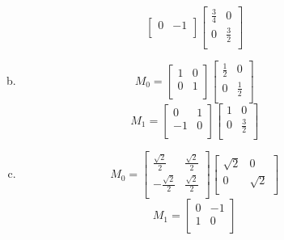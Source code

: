 \documentclass[11pt, oneside]{article}
\begin{document}
\begin{enumerate}[Problem 1:]
\begin{enumerate}[1.]
\begin{enumerate}[a)]
\[\begin{bmatrix}
                0 & -1\\
              \end{bmatrix}
              \begin{bmatrix}
                \frac 3 4 & 0\\
                0 & \frac 3 2\\
              \end{bmatrix}
            \]
          \item
            \[
              M_0 = 
              \begin{bmatrix}
                1 & 0\\
                0 & 1\\
              \end{bmatrix}
              \begin{bmatrix}
                \frac 1 2 & 0\\
                0 & \frac 1 2\\
              \end{bmatrix}
            \]
            \[
              M_1 = 
              \begin{bmatrix}
                0 & 1\\
                -1 & 0\\
              \end{bmatrix}
              \begin{bmatrix}
                1 & 0\\
                0 & \frac 3 2\\
              \end{bmatrix}
            \]
          \item
            \[
              M_0 = 
              \begin{bmatrix}
                \frac {\sqrt 2} 2 & \frac {\sqrt 2} 2\\
                -\frac {\sqrt 2} 2 & \frac {\sqrt 2} 2\\
              \end{bmatrix}
              \begin{bmatrix}
                \sqrt 2 & 0\\
                0 & \sqrt 2\\
              \end{bmatrix}
            \]
            \[
              M_1 = 
              \begin{bmatrix}
                0 & -1\\
                1 & 0\\

\end{bmatrix}\]
\end{enumerate}
\end{enumerate}
\end{enumerate}
\end{document}
